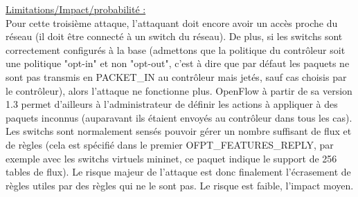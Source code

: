 \underline{Limitations/Impact/probabilité :}\\
Pour cette troisième attaque, l’attaquant doit encore avoir un accès proche du réseau (il doit être connecté à un switch du réseau). De plus, si les switchs sont correctement configurés à la base (admettons que la politique du contrôleur soit une politique "opt-in" et non "opt-out", c’est à dire que par défaut les paquets ne sont pas transmis en PACKET\_IN au contrôleur mais jetés, sauf cas choisis par le contrôleur), alors l’attaque ne fonctionne plus. OpenFlow à partir de sa version 1.3 permet d’ailleurs à l’administrateur de définir les actions à appliquer à des paquets inconnus (auparavant ils étaient envoyés au contrôleur dans tous les cas). Les switchs sont normalement sensés pouvoir gérer un nombre suffisant de flux et de règles (cela est spécifié dans le premier OFPT\_FEATURES\_REPLY, par exemple avec les switchs virtuels mininet, ce paquet indique le support de 256 tables de flux). Le risque majeur de l’attaque est donc finalement l’écrasement de règles utiles par des règles qui ne le sont pas. Le risque est faible, l’impact moyen.